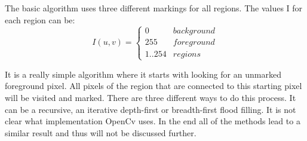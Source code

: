 The basic algorithm uses three different markings for all regions. The values I for each region can be:
\[I(u,v) = \begin{cases} 0 & background \\  255 & foreground \\ 1..254 & regions \end{cases} \]

It is a really simple algorithm where it starts with looking for an unmarked foreground pixel. All pixels of the region that are connected to this starting pixel will be visited and marked. There are three different ways to do this process. It can be a recursive, an iterative depth-first or breadth-first flood filling. It is not clear what implementation OpenCv uses. In the end all of the methods lead to a similar result and thus will not be discussed further.
